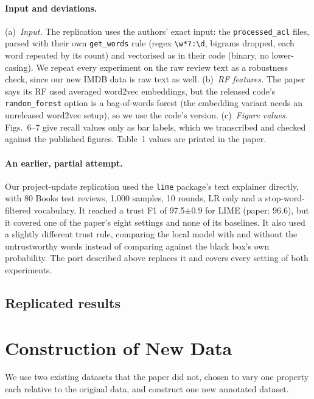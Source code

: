 \documentclass[11pt]{article}
\begin{document}
\paragraph{Input and deviations.} (a)~\emph{Input.} The replication uses the authors' exact input: the \texttt{processed\_acl} files, parsed with their own \texttt{get\_words} rule (regex \texttt{\textbackslash w*?:\textbackslash d}, bigrams dropped, each word repeated by its count) and vectorised as in their code (binary, no lower-casing). We repeat every experiment on the raw review text as a robustness check, since our new IMDB data is raw text as well. (b)~\emph{RF features.} The paper says its RF used averaged word2vec embeddings, but the released code's \texttt{random\_forest} option is a bag-of-words forest (the embedding variant needs an unreleased word2vec setup), so we use the code's version. (c)~\emph{Figure values.} Figs.~6--7 give recall values only as bar labels, which we transcribed and checked against the published figures. Table~1 values are printed in the paper.

\paragraph{An earlier, partial attempt.} Our project-update replication used the \texttt{lime} package's text explainer directly, with 80 Books test reviews, 1,000 samples, 10 rounds, LR only and a stop-word-filtered vocabulary. It reached a trust F1 of 97.5$\pm$0.9 for LIME (paper: 96.6), but it covered one of the paper's eight settings and none of its baselines. It also used a slightly different trust rule, comparing the local model with and without the untrustworthy words instead of comparing against the black box's own probability. The port described above replaces it and covers every setting of both experiments.

\subsection{Replicated results}


\section{Construction of New Data}
\label{sec:newdata}
We use two existing datasets that the paper did not, chosen to vary one property each relative to the original data, and construct one new annotated dataset.
\end{document}
